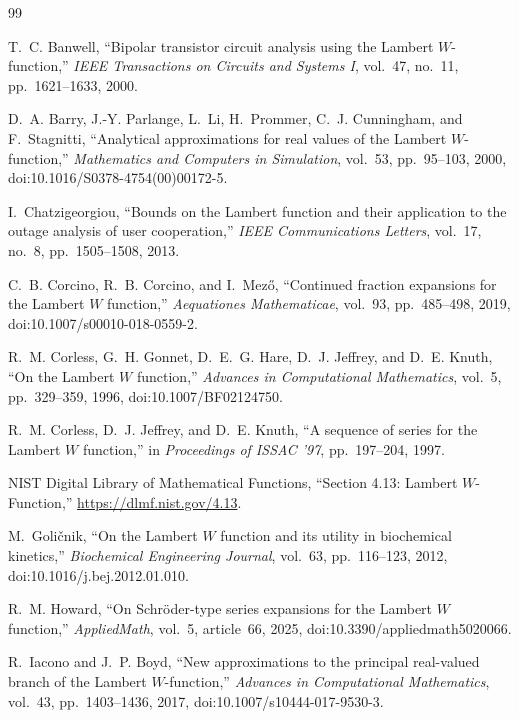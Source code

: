 \documentclass[11pt]{article}
\theoremstyle{remark}
\begin{document}
\begin{thebibliography}{99}

T.~C. Banwell,
``Bipolar transistor circuit analysis using the Lambert \(W\)-function,''
\emph{IEEE Transactions on Circuits and Systems I}, vol.~47, no.~11,
pp.~1621--1633, 2000.

D.~A. Barry, J.-Y. Parlange, L.~Li, H.~Prommer, C.~J. Cunningham, and
F.~Stagnitti,
``Analytical approximations for real values of the Lambert \(W\)-function,''
\emph{Mathematics and Computers in Simulation}, vol.~53, pp.~95--103,
2000, doi:10.1016/S0378-4754(00)00172-5.

I.~Chatzigeorgiou,
``Bounds on the Lambert function and their application to the outage
analysis of user cooperation,''
\emph{IEEE Communications Letters}, vol.~17, no.~8, pp.~1505--1508, 2013.

C.~B. Corcino, R.~B. Corcino, and I.~Mez\H{o},
``Continued fraction expansions for the Lambert \(W\) function,''
\emph{Aequationes Mathematicae}, vol.~93, pp.~485--498, 2019,
doi:10.1007/s00010-018-0559-2.

R.~M. Corless, G.~H. Gonnet, D.~E.~G. Hare, D.~J. Jeffrey, and D.~E. Knuth,
``On the Lambert \(W\) function,''
\emph{Advances in Computational Mathematics}, vol.~5, pp.~329--359, 1996,
doi:10.1007/BF02124750.

R.~M. Corless, D.~J. Jeffrey, and D.~E. Knuth,
``A sequence of series for the Lambert \(W\) function,'' in
\emph{Proceedings of ISSAC '97}, pp.~197--204, 1997.

NIST Digital Library of Mathematical Functions,
``Section 4.13: Lambert \(W\)-Function,''
\url{https://dlmf.nist.gov/4.13}.

M.~Goli\v{c}nik,
``On the Lambert \(W\) function and its utility in biochemical kinetics,''
\emph{Biochemical Engineering Journal}, vol.~63, pp.~116--123, 2012,
doi:10.1016/j.bej.2012.01.010.

R.~M. Howard,
``On Schr\"oder-type series expansions for the Lambert \(W\) function,''
\emph{AppliedMath}, vol.~5, article~66, 2025,
doi:10.3390/appliedmath5020066.

R.~Iacono and J.~P. Boyd,
``New approximations to the principal real-valued branch of the Lambert
\(W\)-function,''
\emph{Advances in Computational Mathematics}, vol.~43, pp.~1403--1436,
2017, doi:10.1007/s10444-017-9530-3.


\end{thebibliography}
\end{document}
